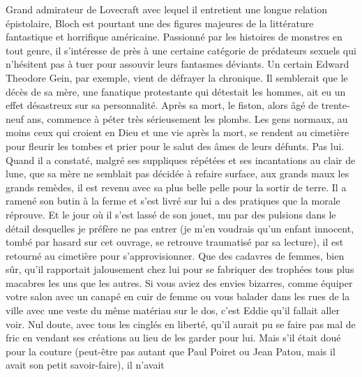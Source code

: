\illuspagebreak
{}%

Grand admirateur de Lovecraft avec lequel il entretient une longue relation épistolaire, Bloch est pourtant une des figures majeures de la littérature fantastique et horrifique américaine. Passionné par les histoires de monstres en tout genre, il s’intéresse de près à une certaine catégorie de prédateurs sexuels qui n’hésitent pas à tuer pour assouvir leurs fantasmes déviants. Un certain Edward Theodore Gein, par exemple, vient de défrayer la chronique. Il semblerait que le décès de sa mère, une fanatique protestante qui détestait les hommes, ait eu un effet désastreux sur sa personnalité. Après sa mort, le fiston, alors âgé de trente-neuf ans, commence à péter très sérieusement les plombs. Les gens normaux, au moins ceux qui croient en Dieu et une vie après la mort, se rendent au cimetière pour fleurir les tombes et prier pour le salut des âmes de leurs défunts. Pas lui. Quand il a constaté, malgré ses suppliques répétées et ses incantations au clair de lune, que sa mère ne semblait pas décidée à refaire surface, aux grands maux les grands remèdes, il est revenu avec sa plus belle pelle pour la sortir de terre. Il a ramené son butin à la ferme et s’est livré sur lui a des pratiques que la morale réprouve. Et le jour où il s’est lassé de son jouet, mu par des pulsions dans le détail desquelles je préfère ne pas entrer (je m’en voudrais qu’un enfant innocent, tombé par hasard sur cet ouvrage, se retrouve traumatisé par sa lecture), il est retourné au cimetière pour s’approvisionner. Que des cadavres de femmes, bien sûr, qu’il rapportait jalousement chez lui pour se fabriquer des trophées tous plus macabres les uns que les autres. Si vous aviez des envies bizarres, comme équiper votre salon avec un canapé en cuir de femme ou vous balader dans les rues de la ville avec une veste du même matériau sur le dos, c’est Eddie qu’il fallait aller voir. Nul doute, avec tous les cinglés en liberté, qu’il aurait pu se faire pas mal de fric en vendant ses créations au lieu de les garder pour lui. Mais s’il était doué pour la couture (peut-être pas autant que Paul Poiret ou Jean Patou, mais il avait son petit savoir-faire), il n’avait 